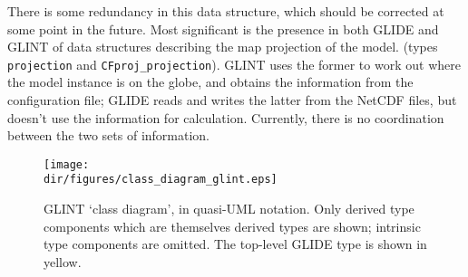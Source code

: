 There is some redundancy in this data structure, which should be corrected at
some point in the future. Most significant is the presence in both GLIDE and
GLINT of data structures describing the map projection of the model. (types
\texttt{projection} and \texttt{CFproj\_projection}). GLINT uses the former to
work out where the model instance is on the globe, and obtains the information
from the configuration file; GLIDE reads and writes the latter from the NetCDF
files, but doesn't use the information for calculation. Currently, there is no
coordination between the two sets of information. 
%
\begin{figure}[htbp]
\centering
\texttt{[image: \\dir/figures/class\_diagram\_glint.eps]}
\caption{GLINT `class diagram', in quasi-UML notation. Only derived type components which
  are themselves derived types are shown; intrinsic type components are
  omitted. The top-level GLIDE type is shown in yellow.}
\label{dg.fig.glint_class_diagram}
\end{figure}


